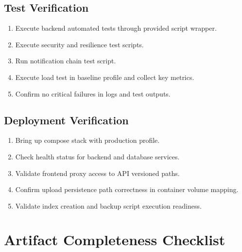 \subsection{Test Verification}

\begin{enumerate}
\item Execute backend automated tests through provided script wrapper.
\item Execute security and resilience test scripts.
\item Run notification chain test script.
\item Execute load test in baseline profile and collect key metrics.
\item Confirm no critical failures in logs and test outputs.
\end{enumerate}

\subsection{Deployment Verification}

\begin{enumerate}
\item Bring up compose stack with production profile.
\item Check health status for backend and database services.
\item Validate frontend proxy access to API versioned paths.
\item Confirm upload persistence path correctness in container volume mapping.
\item Validate index creation and backup script execution readiness.
\end{enumerate}

\section{Artifact Completeness Checklist}

